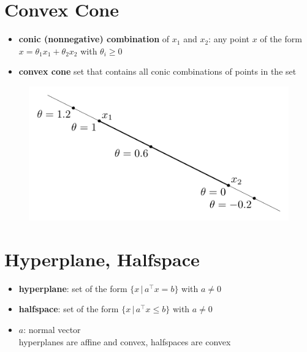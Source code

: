 \documentclass[11pt]{extarticle}
\newcommand{\ds}{\displaystyle}
\theoremstyle{definition}
\begin{document}
\newpage

\section*{Convex Cone}
\begin{itemize}
  \item {\bf conic (nonnegative) combination} of $x_1$ and $x_2$: any point $x$ of the form $x = \theta_1 x_1 + \theta_2 x_2$ with $\theta_i\geqslant 0$
  \item {\bf convex cone} set that contains all conic combinations of points in the set
\end{itemize}

\begin{figure}[!htbp]
  \centering
  \includegraphics[scale=0.9,page=4]{fig/02.pdf}
\end{figure}

\newpage

\section*{Hyperplane, Halfspace}
\begin{itemize}
  \item {\bf hyperplane}: set of the form $\ds\{x\,|\,a^\top x = b\}$ with $a\ne 0$
  \item {\bf halfspace}: set of the form $\ds\{x\,|\,a^\top x\leqslant b\}$ with $a\ne 0$
  \item $a$: normal vector \\ hyperplanes are affine and convex, halfspaces are convex 
\end{itemize}
\end{document}
